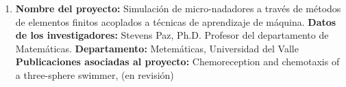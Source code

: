 \begin{spacing}{1.5}
\begin{enumerate}
    \item \textbf{Nombre del proyecto:} Simulación de micro-nadadores a
          través de métodos de elementos finitos acoplados a técnicas de aprendizaje de
          máquina. \newline
          \textbf{Datos de los investigadores:} \newline
          Stevens Paz, Ph.D. Profesor del departamento de Matemáticas. \newline
          \textbf{Departamento: } Metemáticas, Universidad del Valle \newline
          \textbf{Publicaciones asociadas al proyecto: } \newline Chemoreception
          and chemotaxis of a three-sphere swimmer, (en revisión)

  \end{enumerate}

  \mylinespacing
  \mylinespacing
  \begin{tightcenter}
  \end{tightcenter}
\end{spacing}